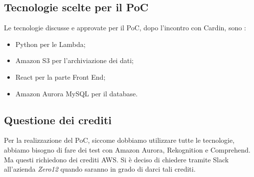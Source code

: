 \subsection{Tecnologie scelte per il PoC}
Le tecnologie discusse e approvate per il PoC, dopo l'incontro con Cardin, sono : 
\begin{itemize}
    \item Python per le Lambda;
    \item Amazon S3 per l'archiviazione dei dati;
    \item React per la parte Front End;
    \item Amazon Aurora MySQL per il database.
\end{itemize}

\subsection{Questione dei crediti}
Per la realizzazione del PoC, siccome dobbiamo utilizzare tutte le tecnologie, abbiamo bisogno di fare dei test con Amazon Aurora, Rekognition e Comprehend. Ma questi richiedono dei crediti AWS. Si è deciso di chiedere tramite Slack all'azienda \textit{Zero12} quando saranno in grado di darci tali crediti.

\pagebreak


